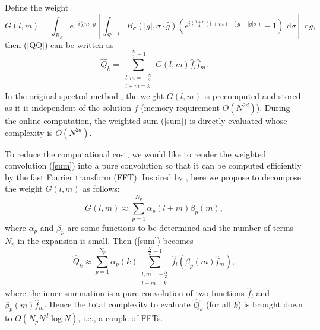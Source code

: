 \documentclass[review, times]{elsarticle}
\newcommand{\rd}{\,\mathrm{d}}
\begin{document}
Define the weight
\begin{equation} \label{weight}
G(l,m)=\int_{B_R}e^{-i\frac{\pi}{L}m \cdot g}\left[\int_{S^{d-1}}B_{\sigma}(|g|,\sigma\cdot \hat{g})\left(e^{i\frac{\pi}{L}\frac{1+e}{4}(l+m)\cdot (g-|g|\sigma)}-1\right)\,\rd{\sigma}\right]\,\rd{g},
\end{equation}
then (\ref{QQ}) can be written as
\begin{equation} \label{sum}
\hat{Q}_k=\sum_{\substack{l,m=-\frac{N}{2}\\l+m=k}}^{\frac{N}{2}-1}G(l,m)\hat{f}_l\hat{f}_m.
\end{equation} 
In the original spectral method \cite{FPT05}, the weight $G(l,m)$ is precomputed and stored as it is independent of the solution $f$ (memory requirement $O(N^{2d})$). During the online computation, the weighted sum (\ref{sum}) is directly evaluated whose complexity is $O(N^{2d})$.

To reduce the computational cost, we would like to render the weighted convolution (\ref{sum}) into a pure convolution so that it can be computed efficiently by the fast Fourier transform (FFT). Inspired by \cite{GHHH17}, here we propose to decompose the weight $G(l,m)$ as follows:
\begin{equation} \label{lowrank}
G(l,m)\approx\sum_{p=1}^{N_p}\alpha_p(l+m)\beta_p(m),
\end{equation}
where $\alpha_p$ and $\beta_p$ are some functions to be determined and the number of terms $N_p$ in the expansion is small. Then (\ref{sum}) becomes
\begin{equation}
\hat{Q}_k\approx \sum_{p=1}^{N_p}\alpha_p(k)\sum_{\substack{l,m=-\frac{N}{2}\\l+m=k}}^{\frac{N}{2}-1}\hat{f}_l  \left(\beta_p(m)\hat{f}_m\right),
\end{equation} 
where the inner summation is a pure convolution of two functions $\hat{f}_l$ and $\beta_p(m)\hat{f}_m$. Hence the total complexity to evaluate $\hat{Q}_k$ (for all $k$) is brought down to $O(N_pN^d\log N)$, i.e., a couple of FFTs.
\end{document}
